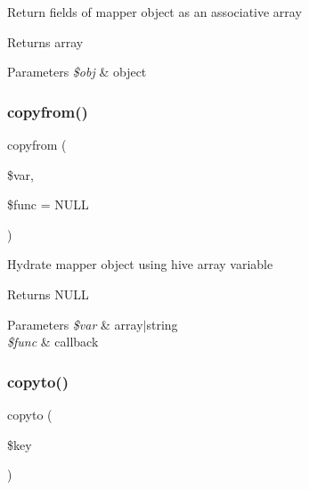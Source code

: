 Return fields of mapper object as an associative array \begin{DoxyReturn}{Returns}
array 
\end{DoxyReturn}

\begin{DoxyParams}{Parameters}
{\em \$obj} & object \\
\hline
\end{DoxyParams}
\hypertarget{class_d_b_1_1_cursor_adffe904ab38af888d9b033647ec6d935}{}\label{class_d_b_1_1_cursor_adffe904ab38af888d9b033647ec6d935} 
\subsubsection{\texorpdfstring{copyfrom()}{copyfrom()}}
{\footnotesize\ttfamily copyfrom (\begin{DoxyParamCaption}\item[{}]{\$var,  }\item[{}]{\$func = {\ttfamily NULL} }\end{DoxyParamCaption})\hspace{0.3cm}{\ttfamily [abstract]}}

Hydrate mapper object using hive array variable \begin{DoxyReturn}{Returns}
N\+U\+LL 
\end{DoxyReturn}

\begin{DoxyParams}{Parameters}
{\em \$var} & array$\vert$string \\
\hline
{\em \$func} & callback \\
\hline
\end{DoxyParams}
\hypertarget{class_d_b_1_1_cursor_a4bcf54f913758fb093c35ea81fc29615}{}\label{class_d_b_1_1_cursor_a4bcf54f913758fb093c35ea81fc29615} 
\subsubsection{\texorpdfstring{copyto()}{copyto()}}
{\footnotesize\ttfamily copyto (\begin{DoxyParamCaption}\item[{}]{\$key }\end{DoxyParamCaption})\hspace{0.3cm}{\ttfamily [abstract]}}

